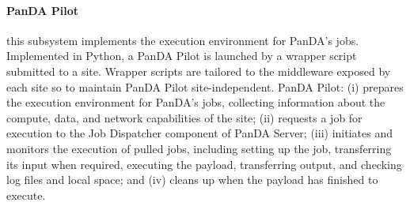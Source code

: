 \paragraph{\textbf{PanDA Pilot}} this subsystem implements the execution
environment for PanDA's jobs\cite{nilsson2011atlas}. Implemented in Python, a
PanDA Pilot is launched by a wrapper script submitted to a site. Wrapper scripts
are tailored to the middleware exposed by each site so to maintain PanDA Pilot
site-independent. PanDA Pilot: (i) prepares the execution environment for
PanDA's jobs,
collecting information about the compute, data, and network capabilities of the
site; (ii) requests a job for execution to the Job Dispatcher component of PanDA
Server; (iii) initiates and monitors the execution of pulled jobs, including
setting up the job, transferring its input when required, executing the payload,
transferring output, and checking log files and local space; and (iv) cleans up
when the payload has finished to execute.




